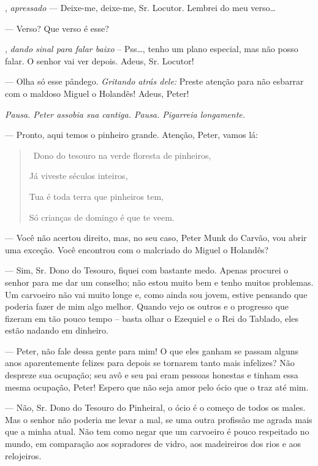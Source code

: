 \begin{myparindent}{0pt}
\begin{Parskip}
, \emph{apressado} --- Deixe-me, deixe-me, Sr.
Locutor. Lembrei do meu verso\ldots{}

 --- Verso? Que verso é esse?

, \emph{dando sinal para falar baixo} --
Pss\ldots{}, tenho um plano especial, mas não posso falar. O senhor vai
ver depois. Adeus, Sr. Locutor!

 --- Olha só esse pândego. \emph{Gritando atrás dele:} Preste
atenção para não esbarrar com o maldoso Miguel o Holandês! Adeus, Peter!

\emph{Pausa. Peter assobia sua cantiga. Pausa. Pigarreia longamente.}

 --- Pronto, aqui temos o pinheiro grande. Atenção,
Peter, vamos lá:

\begin{quote}
\quad \, Dono do tesouro na verde floresta de pinheiros,

Já viveste séculos inteiros,

Tua é toda terra que pinheiros tem,

Só crianças de domingo é que te veem.
\end{quote}

 --- Você não acertou direito, mas, no seu caso, Peter Munk
do Carvão, vou abrir uma exceção. Você encontrou com o malcriado do
Miguel o Holandês?

 --- Sim, Sr. Dono do Tesouro, fiquei com bastante
medo. Apenas procurei o senhor para me dar um conselho; não estou muito
bem e tenho muitos problemas. Um carvoeiro não vai muito longe e, como
ainda sou jovem, estive pensando que poderia fazer de mim algo melhor.
Quando vejo os outros e o progresso que fizeram em tão pouco tempo --
basta olhar o Ezequiel e o Rei do Tablado, eles estão nadando em
dinheiro.

 --- Peter, não fale dessa gente para mim! O que eles ganham
se passam alguns anos aparentemente felizes para depois se tornarem
tanto mais infelizes? Não despreze sua ocupação; seu avô e seu pai eram
pessoas honestas e tinham essa mesma ocupação, Peter! Espero que não
seja amor pelo ócio que o traz até mim.

 --- Não, Sr. Dono do Tesouro do Pinheiral, o ócio é
o começo de todos os males. Mas o senhor não poderia me levar a mal, se
uma outra profissão me agrada mais que a minha atual. Não tem como negar
que um carvoeiro é pouco respeitado no mundo, em comparação aos
sopradores de vidro, aos madeireiros dos rios e aos relojeiros.


\end{Parskip}
\end{myparindent}
